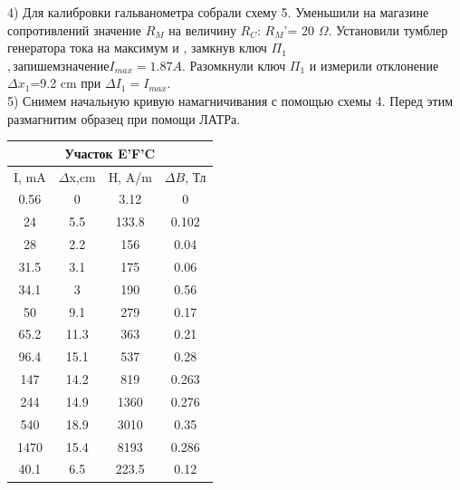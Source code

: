 \documentclass[a4paper,12pt]{article} %
\begin{document}
4) Для калибровки гальванометра собрали схему 5. Уменьшили на магазине сопротивлений значение $R_M$ на величину $R_C$: $R_M$'= 20 $\Omega$. Установили тумблер генератора тока на максимум и , замкнув ключ $\Pi_1$ $, запишем значение I_{max}=1.87 A$. Разомкнули ключ  $\Pi_1$ и измерили отклонение $\Delta x_1$=9.2 cm при $\Delta I_1=I_{max}$. \\
5) Снимем начальную кривую намагничивания с помощью схемы 4. Перед этим размагнитим образец при помощи ЛАТРа. \\
\begin{center}

\begin{tabular}{|c|c|c|c|}
\hline 
\multicolumn{4}{|c|}{Участок E'F'C} \\ 
\hline
I, mA & $\Delta$x,cm & H, A/m & $\Delta B$, Тл \\
\hline 
0.56 & 0 &3.12 & 0\\ 
\hline 
24 & 5.5&133.8 & 0.102 \\ 
\hline 
28 & 2.2& 156& 0.04 \\ 
\hline 
31.5 & 3.1&175 &0.06 \\ 
\hline 
34.1 & 3& 190& 0.56\\ 
\hline 
50 & 9.1 &279 &0.17\\ 
\hline 
65.2 & 11.3& 363& 0.21 \\ 
\hline 
96.4 & 15.1& 537& 0.28\\ 
\hline 
147 & 14.2&819 &  0.263\\ 
\hline 
244 & 14.9&1360 &  0.276\\ 
\hline 
540  & 18.9&3010 &0.35 \\ 
\hline 
1470  & 15.4& 8193& 0.286\\ 
\hline 
40.1 & 6.5& 223.5 & 0.12\\ 
\hline 
\end{tabular} 

\end{center}
\end{document}

